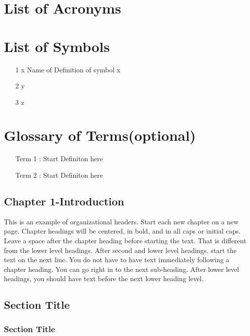 \documentclass[letterpaper,12pt]{article}
\begin{document}
\section {\protect \centering List of Acronyms}
\doublespacing
\newpage
\section{\protect \centering List of Symbols}
\doublespacing
\begin{itemize}
\addtolength{\itemindent}{-0.25in}
\item[1]{x} \hspace{0.5in} Name of Definition of symbol x
\item[2]{y}
\item[3]{z}
\end{itemize}
\newpage
\section {\protect \centering Glossary of Terms(optional)}
\doublespacing
\begin{itemize}
\addtolength{\itemindent}{0.25in}
\item[Term 1]: Start Definiton here
\item[Term 2]: Start Definiton here
\end{itemize}
\newpage
\setcounter{page}{1}
\setcounter{section}{1}
\begin{singlespace}
\section{\protect \centering Chapter 1-Introduction}
\end{singlespace}
\setcounter{section}{1}
\doublespacing
\indent This is an example of organizational headers.  Start each new chapter on a
new page.  Chapter headings will be centered, in bold, and in all caps or initial
caps. \\
\indent Leave a space after the chapter heading before starting the text.  That is
different from the lower level headings.  After second and lower level headings,
start the text on the next line.  You do not have to have text immediately following
a chapter heading.  You can go right in to the next sub-heading.  After lower level
headings, you should have text before the next lower heading level.
\subsection {\normalsize Section Title}
{\addtolength{\leftskip}{0.5in}
\subsubsection {\normalsize Section Title}
}
\end{document}
